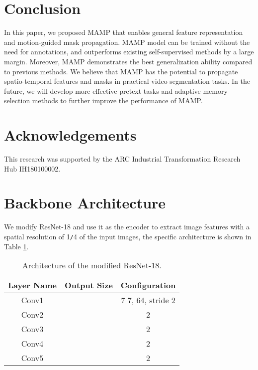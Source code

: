 \documentclass[letterpaper]{article} \usepackage{aaai22}  \usepackage{times}  \usepackage{helvet}  \usepackage{courier}  \usepackage[hyphens]{url}  \usepackage{graphicx} \urlstyle{rm} \def\UrlFont{\rm}  \usepackage{natbib}  \usepackage{caption} \DeclareCaptionStyle{ruled}{labelfont=normalfont,labelsep=colon,strut=off} \frenchspacing  \setlength{\pdfpagewidth}{8.5in}  \setlength{\pdfpageheight}{11in}  \usepackage{algorithm}
\begin{document}
\section{Conclusion}
In this paper, we proposed MAMP that enables general feature representation and motion-guided mask propagation. MAMP model can be trained without the need for annotations, and outperforms existing self-supervised methods by a large margin. Moreover, MAMP demonstrates the best generalization ability compared to previous methods. We believe that MAMP has the potential to propagate spatio-temporal features and masks in practical video segmentation tasks. In the future, we will develop more effective pretext tasks and adaptive memory selection methods to further improve the performance of MAMP.

\section{Acknowledgements}
\vspace{-1mm}
This research was supported by the ARC Industrial Transformation Research Hub IH180100002.





\newpage
\newpage
\appendix
\section{Backbone Architecture}
\vspace{2mm}
We modify ResNet-18 and use it as the encoder to extract image features with a spatial resolution of 1\verb|/|4 of the input images, the specific architecture is shown in Table \ref{resnet}.

\begin{table}[h]
\centering
\begin{tabular}{ccc}
\toprule[1.5pt]
Layer Name & Output Size & Configuration \\
\hline
Conv1 &  & 7  7, 64, stride 2\\
Conv2 &  &  2 \\
Conv3 &  &  2 \\
Conv4 &  &  2 \\
Conv5 &  &  2 \\
\toprule[1.5pt]
\end{tabular}
\caption{Architecture of the modified ResNet-18.}
\label{resnet}
\end{table}
\end{document}
